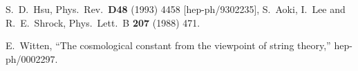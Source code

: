 \documentclass[a4paper,12pt]{article}
\begin{document}
\begin{thebibliography}{10}
S.~D.~Hsu,
Phys.\ Rev.\  {\bf D48} (1993) 4458
[hep-ph/9302235],
S.~Aoki, I.~Lee and R.~E.~Shrock,
Phys.\ Lett.\ B {\bf 207} (1988) 471.

E.~Witten,
``The cosmological constant from the viewpoint of string theory,''
hep-ph/0002297.
\end{thebibliography}
\end{document}
